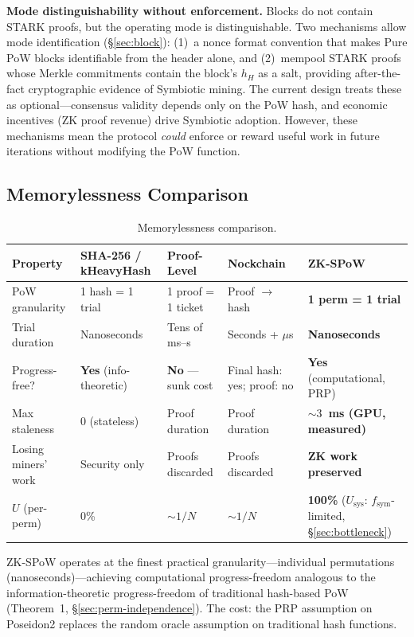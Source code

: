 \documentclass[11pt,a4paper]{article}
\begin{document}
\textbf{Mode distinguishability without enforcement.} Blocks do not contain STARK proofs, but the operating mode is distinguishable. Two mechanisms allow mode identification (\S\ref{sec:block}): (1)~a nonce format convention that makes Pure PoW blocks identifiable from the header alone, and (2)~mempool STARK proofs whose Merkle commitments contain the block's $h_H$ as a salt, providing after-the-fact cryptographic evidence of Symbiotic mining. The current design treats these as optional---consensus validity depends only on the PoW hash, and economic incentives (ZK proof revenue) drive Symbiotic adoption. However, these mechanisms mean the protocol \emph{could} enforce or reward useful work in future iterations without modifying the PoW function.

\subsection{Memorylessness Comparison}

\begin{table}[h]
\centering
\small
\begin{tabular}{@{}lp{}p{}p{}p{}@{}}
\toprule
Property & SHA-256 / kHeavyHash & Proof-Level~\cite{oleksak2025} & Nockchain~\cite{nockchain} & \textbf{ZK-SPoW} \\
\midrule
PoW granularity & 1 hash = 1 trial & 1 proof = 1 ticket & Proof $\to$ hash & \textbf{1 perm = 1 trial} \\
Trial duration & Nanoseconds & Tens of ms--s & Seconds + $\mu$s & \textbf{Nanoseconds} \\
Progress-free? & \textbf{Yes} (info-theoretic) & \textbf{No} --- sunk cost & Final hash: yes; proof: no & \textbf{Yes} (computational, PRP) \\
Max staleness & 0 (stateless) & Proof duration & Proof duration & \textbf{${\sim}3$~ms (GPU, measured)} \\
Losing miners' work & Security only & Proofs discarded & Proofs discarded & \textbf{ZK work preserved} \\
$U$ (per-perm) & 0\% & ${\sim}1/N$ & ${\sim}1/N$ & \textbf{100\%} ($U_{\mathrm{sys}}$: $f_{\mathrm{sym}}$-limited, \S\ref{sec:bottleneck}) \\
\bottomrule
\end{tabular}
\caption{Memorylessness comparison.}
\label{tab:memoryless}
\end{table}

ZK-SPoW operates at the finest practical granularity---individual permutations (nanoseconds)---achieving computational progress-freedom analogous to the information-theoretic progress-freedom of traditional hash-based PoW (Theorem~1, \S\ref{sec:perm-independence}). The cost: the PRP assumption on Poseidon2 replaces the random oracle assumption on traditional hash functions.
\end{document}
